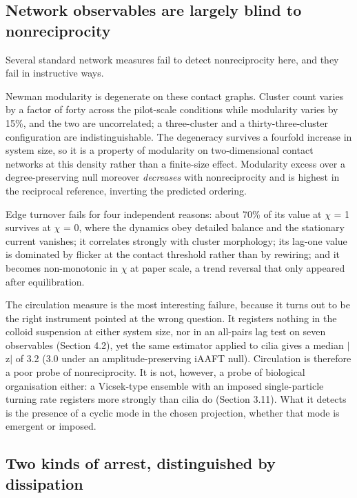 \documentclass[aps,pre,preprint,superscriptaddress,nofootinbib,longbibliography]{revtex4-2}
\begin{document}
\subsection{Network observables are largely blind to nonreciprocity}

Several standard network measures fail to detect nonreciprocity here, and they fail in instructive ways.

Newman modularity is degenerate on these contact graphs. Cluster count varies by a factor of forty across the pilot-scale conditions while modularity varies by 15\%, and the two are uncorrelated; a three-cluster and a thirty-three-cluster configuration are indistinguishable. The degeneracy survives a fourfold increase in system size, so it is a property of modularity on two-dimensional contact networks at this density rather than a finite-size effect. Modularity excess over a degree-preserving null moreover \emph{decreases} with nonreciprocity and is highest in the reciprocal reference, inverting the predicted ordering.

Edge turnover fails for four independent reasons: about 70\% of its value at $\chi$ = 1 survives at $\chi$ = 0, where the dynamics obey detailed balance and the stationary current vanishes; it correlates strongly with cluster morphology; its lag-one value is dominated by flicker at the contact threshold rather than by rewiring; and it becomes non-monotonic in $\chi$ at paper scale, a trend reversal that only appeared after equilibration.

The circulation measure is the most interesting failure, because it turns out to be the right instrument pointed at the wrong question. It registers nothing in the colloid suspension at either system size, nor in an all-pairs lag test on seven observables (Section 4.2), yet the same estimator applied to cilia gives a median $|$z$|$ of 3.2 (3.0 under an amplitude-preserving iAAFT null). Circulation is therefore a poor probe of nonreciprocity. It is not, however, a probe of biological organisation either: a Vicsek-type ensemble with an imposed single-particle turning rate registers more strongly than cilia do (Section 3.11). What it detects is the presence of a cyclic mode in the chosen projection, whether that mode is emergent or imposed.

\subsection{Two kinds of arrest, distinguished by dissipation}
\end{document}
